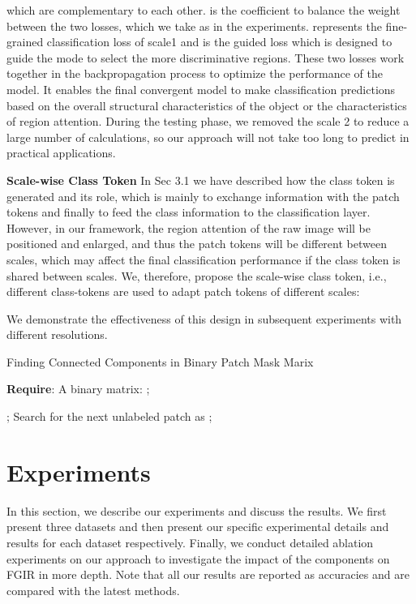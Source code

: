 \documentclass[sigconf]{acmart}
\begin{document}
which are complementary to each other.  is the coefficient to balance the weight between the two losses, which we take as  in the experiments.  represents the fine-grained classification loss of scale1 and  is the guided loss which is designed to guide the mode to select the more discriminative regions. These two losses work together in the backpropagation process to optimize the performance of the model. It enables the final convergent model to make classification predictions based on the overall structural characteristics of the object or the characteristics of region attention. During the testing phase, we removed the scale 2 to reduce a large number of calculations, so our approach will not take too long to predict in practical applications. 

\textbf{Scale-wise Class Token} In Sec 3.1 we have described how the class token is generated and its role, which is mainly to exchange information with the patch tokens and finally to feed the class information to the classification layer. However, in our framework, the region attention of the raw image will be positioned and enlarged, and thus the patch tokens will be different between scales, which may affect the final classification performance if the class token is shared between scales. We, therefore, propose the scale-wise class token, i.e., different class-tokens are used to adapt patch tokens of different scales:

We demonstrate the effectiveness of this design in subsequent experiments with different resolutions.

\begin{algorithm}[tb]
\caption{Finding Connected Components in Binary Patch Mask Marix}
\label{alg:algorithm}
\textbf{Require}: A binary matrix: ;
\begin{algorithmic}[1] 
    ;
    \ENDIF
\STATE Search for the next unlabeled patch as ;
\ENDWHILE
{}
\end{algorithmic}
\end{algorithm}

\section{Experiments}
In this section, we describe our experiments and discuss the results. We first present three datasets and then present our specific experimental details and results for each dataset respectively. Finally, we conduct detailed ablation experiments on our approach to investigate the impact of the components on FGIR in more depth. Note that all our results are reported as accuracies and are compared with the latest methods.
\end{document}
